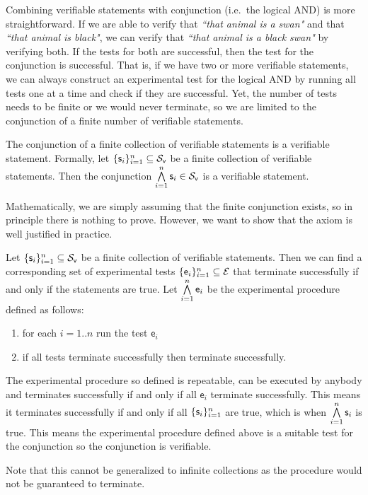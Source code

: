 \documentclass[11pt,letterpaper,fleqn]{memoir} %
\begin{document}
Combining verifiable statements with conjunction (i.e.~the logical AND) is more straightforward. If we are able to verify that \emph{``that animal is a swan"} and that \emph{``that animal is black"}, we can verify that \emph{``that animal is a black swan"} by verifying both. If the tests for both are successful, then the test for the conjunction is successful. That is, if we have two or more verifiable statements, we can always construct an experimental test for the logical AND by running all tests one at a time and check if they are successful. Yet, the number of tests needs to be finite or we would never terminate, so we are limited to the conjunction of a finite number of verifiable statements.

\begin{mathSection}
	\begin{axiom}\label{ax_verifiable_AND}
	The conjunction of a finite collection of verifiable statements is a verifiable statement. Formally, let $\{\mathsf{s}_i\}_{i=1}^{n} \subseteq \mathcal{S}_\textsf{v}$ be a finite collection of verifiable statements. Then the conjunction $\bigwedge\limits_{i=1}^{n} \mathsf{s}_i \in \mathcal{S}_\textsf{v}$ is a verifiable statement.
	\end{axiom}
	\begin{justification}
		Mathematically, we are simply assuming that the finite conjunction exists, so in principle there is nothing to prove. However, we want to show that the axiom is well justified in practice.
		
		Let $\{\mathsf{s}_i\}_{i=1}^{n} \subseteq \mathcal{S}_\textsf{v}$ be a finite collection of verifiable statements. Then we can find a corresponding set of experimental tests $\{\mathsf{e}_i\}_{i=1}^{n} \subseteq \mathcal{E}$ that terminate successfully if and only if the statements are true. Let $\bigwedge\limits_{i=1}^{n} \mathsf{e}_i$ be the experimental procedure defined as follows:
		\begin{enumerate}
			\item for each $i=1..n$ run the test $\mathsf{e}_i$
			\item if all tests terminate successfully then terminate successfully.
		\end{enumerate}
		The experimental procedure so defined is repeatable, can be executed by anybody and terminates successfully if and only if all $\mathsf{e}_i$ terminate successfully. This means it terminates successfully if and only if all $\{\mathsf{s}_i\}_{i=1}^{n}$ are true, which is when $\bigwedge\limits_{i=1}^{n} \mathsf{s}_i$ is true. This means the experimental procedure defined above is a suitable test for the conjunction so the conjunction is verifiable.
		
		Note that this cannot be generalized to infinite collections as the procedure would not be guaranteed to terminate.
	\end{justification}
\end{mathSection}	
\end{document}
